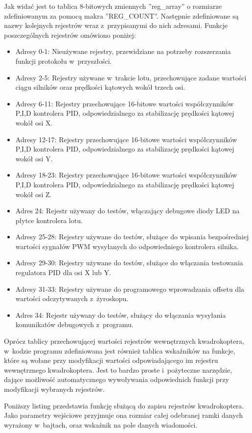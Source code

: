 \documentclass[11pt, twoside]{Thesis} %
\begin{document}
Jak widać jest to tablica 8-bitowych zmiennych ''reg\_array'' o rozmiarze zdefiniowanym za pomocą makra ''REG\_COUNT''. Następnie zdefiniowane są nazwy kolejnych rejestrów wraz z~przypisanymi do nich adresami. Funkcje poszczególnych rejestrów omówiono poniżej:
\begin{itemize}
	\item Adresy 0-1: Nieużywane rejestry, przewidziane na potrzeby rozszerzania funkcji protokołu w~przyszłości.
	\item Adresy 2-5: Rejestry używane w~trakcie lotu, przechowujące zadane wartości ciągu silników oraz prędkości kątowych wokół trzech osi.
	\item Adresy 6-11: Rejestry przechowujące 16-bitowe wartości współczynników P,I,D kontrolera PID, odpowiedzialnego za stabilizację prędkości kątowej wokół osi X.
	\item Adresy 12-17: Rejestry przechowujące 16-bitowe wartości współczynników P,I,D kontrolera PID, odpowiedzialnego za stabilizację prędkości kątowej wokół osi Y.
	\item Adresy 18-23: Rejestry przechowujące 16-bitowe wartości współczynników P,I,D kontrolera PID, odpowiedzialnego za stabilizację prędkości kątowej wokół osi Z.
	\item Adres 24: Rejestr używany do testów, włączający debugowe diody LED na płytce kontrolera lotu.
	\item Adresy 25-28: Rejestry używane do testów, służące do wpisania bezpośredniej wartości sygnałów PWM wysyłanych do odpowiedniego kontrolera silnika.
	\item Adresy 29-30: Rejestry używane do testów, służące do włączania testowania regulatora PID dla osi X lub Y.
	\item Adresy 31-33: Rejestry używane do programowego wprowadzania offsetu dla wartości odczytywanych z~żyroskopu.
	\item Adres 34: Rejestr używany do testów, służący do włączania wysyłania komunikatów debugowych z~programu.
\end{itemize}

Oprócz tablicy przechowującej wartości rejestrów wewnętrznych kwadrokoptera, w~kodzie programu zdefiniowana jest również tablica wskaźników na funkcje, które są wołane przy modyfikacji wartości odpowiadającego im rejestru wewnętrznego kwadrokoptera. Jest to bardzo proste i~pożyteczne narzędzie, dające możliwość automatycznego wywoływania odpowiednich funkcji przy modyfikacji wybranych rejestrów.


Poniższy listing przedstawia funkcję służącą do zapisu rejestrów kwadrokoptera. Jako parametry wejściowe przyjmuje ona rozmiar całej odebranej ramki danych wyrażony w~bajtach, oraz wskaźnik na pole danych wiadomości.
\end{document}
